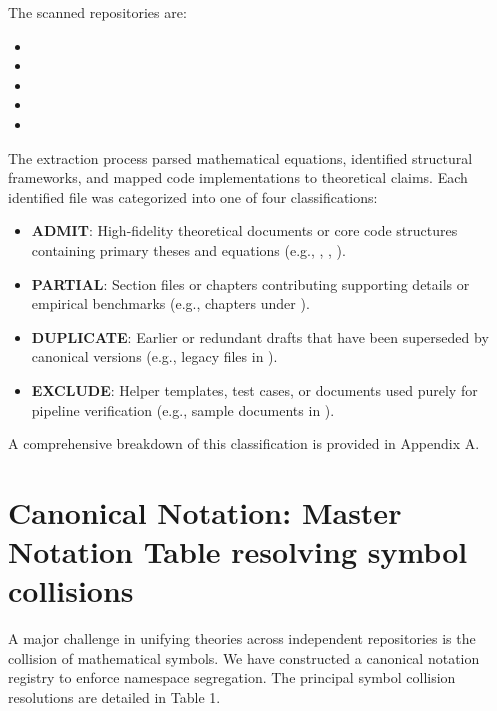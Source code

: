 \documentclass[11pt,a4paper]{article}
\begin{document}
The scanned repositories are:
\begin{itemize}
    \item {}
    \item {}
    \item {}
    \item {}
    \item {}
\end{itemize}

The extraction process parsed mathematical equations, identified structural frameworks, and mapped code implementations to theoretical claims. Each identified file was categorized into one of four classifications:
\begin{itemize}
    \item \textbf{ADMIT}: High-fidelity theoretical documents or core code structures containing primary theses and equations (e.g., , , ).
    \item \textbf{PARTIAL}: Section files or chapters contributing supporting details or empirical benchmarks (e.g., chapters under ).
    \item \textbf{DUPLICATE}: Earlier or redundant drafts that have been superseded by canonical versions (e.g., legacy files in ).
    \item \textbf{EXCLUDE}: Helper templates, test cases, or documents used purely for pipeline verification (e.g., sample documents in ).
\end{itemize}
A comprehensive breakdown of this classification is provided in Appendix A.

\section{Canonical Notation: Master Notation Table resolving symbol collisions}
A major challenge in unifying theories across independent repositories is the collision of mathematical symbols. We have constructed a canonical notation registry to enforce namespace segregation. The principal symbol collision resolutions are detailed in Table 1.
\end{document}
